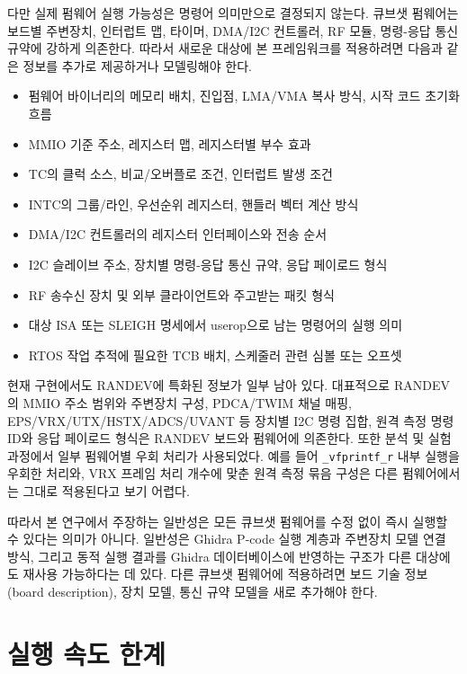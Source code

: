 \documentclass[master,korean,final]{kaist-ucs}
\begin{document}
다만 실제 펌웨어 실행 가능성은 명령어 의미만으로 결정되지 않는다. 큐브샛 펌웨어는 보드별 주변장치, 인터럽트 맵, 타이머, DMA/I2C 컨트롤러, RF 모듈, 명령-응답 통신 규약에 강하게 의존한다. 따라서 새로운 대상에 본 프레임워크를 적용하려면 다음과 같은 정보를 추가로 제공하거나 모델링해야 한다.

\begin{itemize}
    \item 펌웨어 바이너리의 메모리 배치, 진입점, LMA/VMA 복사 방식, 시작 코드 초기화 흐름
    \item MMIO 기준 주소, 레지스터 맵, 레지스터별 부수 효과
    \item TC의 클럭 소스, 비교/오버플로 조건, 인터럽트 발생 조건
    \item INTC의 그룹/라인, 우선순위 레지스터, 핸들러 벡터 계산 방식
    \item DMA/I2C 컨트롤러의 레지스터 인터페이스와 전송 순서
    \item I2C 슬레이브 주소, 장치별 명령-응답 통신 규약, 응답 페이로드 형식
    \item RF 송수신 장치 및 외부 클라이언트와 주고받는 패킷 형식
    \item 대상 ISA 또는 SLEIGH 명세에서 userop으로 남는 명령어의 실행 의미
    \item RTOS 작업 추적에 필요한 TCB 배치, 스케줄러 관련 심볼 또는 오프셋
\end{itemize}

현재 구현에서도 RANDEV에 특화된 정보가 일부 남아 있다. 대표적으로 RANDEV의 MMIO 주소 범위와 주변장치 구성, PDCA/TWIM 채널 매핑, EPS/VRX/UTX/HSTX/ADCS/UVANT 등 장치별 I2C 명령 집합, 원격 측정 명령 ID와 응답 페이로드 형식은 RANDEV 보드와 펌웨어에 의존한다. 또한 분석 및 실험 과정에서 일부 펌웨어별 우회 처리가 사용되었다. 예를 들어 \texttt{\_vfprintf\_r} 내부 실행을 우회한 처리와, VRX 프레임 처리 개수에 맞춘 원격 측정 묶음 구성은 다른 펌웨어에서는 그대로 적용된다고 보기 어렵다.

따라서 본 연구에서 주장하는 일반성은 모든 큐브샛 펌웨어를 수정 없이 즉시 실행할 수 있다는 의미가 아니다. 일반성은 Ghidra P-code 실행 계층과 주변장치 모델 연결 방식, 그리고 동적 실행 결과를 Ghidra 데이터베이스에 반영하는 구조가 다른 대상에도 재사용 가능하다는 데 있다. 다른 큐브샛 펌웨어에 적용하려면 보드 기술 정보(board description), 장치 모델, 통신 규약 모델을 새로 추가해야 한다.

\section{실행 속도 한계}
\end{document}
